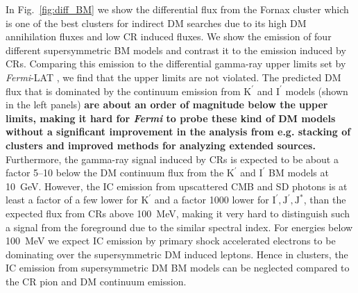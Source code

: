 \documentclass[10pt,aps,pra,reprint,amsmath,amsfonts,amssymb,showpacs,nofootinbib,floatfix]{revtex4-1}
\def\del#1{{}}
\def\C#1{{\bf #1}}
\newcommand{\Fermi}{{\em Fermi}\xspace}
\newcommand{\rmn}{\mathrm}
\newcommand{\Kp}{\rmn{K}^\prime}
\newcommand{\Ip}{\rmn{I}^\prime}
\newcommand{\Js}{\rmn{J}^*}
\newcommand{\Jp}{\rmn{J}^\prime}
\begin{document}
In Fig.~\ref{fig:diff_BM} we show the differential flux from the
Fornax cluster which is one of the best clusters for indirect DM
searches due to its high DM annihilation fluxes and low CR induced
fluxes. We show the emission of four different supersymmetric BM
models and contrast it to the emission induced by CRs. Comparing this
emission to the differential gamma-ray upper limits set by \Fermi-LAT
\del{after 18 months of observations \cite{2010ApJ...717L..71A}}, we
find that the upper limits are not violated. The predicted DM flux
that is dominated by the continuum emission from $\Kp$ and $\Ip$
models (shown in the left panels) \C{are about an order of magnitude
  below the upper limits, making it hard for \Fermi to probe these kind
  of DM models without a significant improvement in the analysis from
  e.g. stacking of clusters and improved methods for analyzing
  extended sources.}  Furthermore, the gamma-ray signal induced by CRs
is expected to be about a factor 5--10 below the DM continuum flux
from the $\Kp$ and $\Ip$ BM models at 10~GeV. However, the IC emission
from upscattered CMB and SD photons is at least a factor of a few
lower for $\Kp$ and a factor 1000 lower for $\Ip,\Jp,\Js$, than the
expected flux from CRs above 100~MeV, making it very hard to
distinguish such a signal from the foreground due to the similar
spectral index. For energies below 100~MeV we expect IC emission by
primary shock accelerated electrons to be dominating
\cite{2010MNRAS.409..449P} over the supersymmetric DM induced
leptons. Hence in clusters, the IC emission from supersymmetric DM BM
models can be neglected compared to the CR pion and DM continuum emission.
\end{document}
